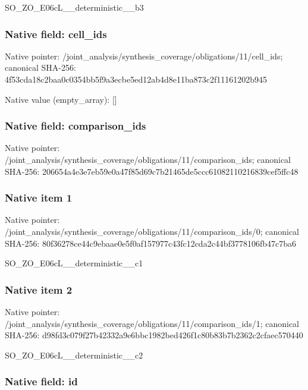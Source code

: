 \documentclass[10pt,a4paper]{article}
\begin{document}
SO\_ZO\_E06cL\_\_deterministic\_\_b3


\subsubsection{Native field: cell\_ids}


Native pointer: /joint\_analysis/synthesi\allowbreak{}s\_coverage/obligations/1\allowbreak{}1/cell\_ids; canonical SHA-256: 4f53cda18c2baa0c0354bb5f\allowbreak{}9a3ecbe5ed12ab4d8e11ba87\allowbreak{}3c2f11161202b945



Native value (empty\_array): []



\subsubsection{Native field: comparison\_ids}


Native pointer: /joint\_analysis/synthesi\allowbreak{}s\_coverage/obligations/1\allowbreak{}1/comparison\_ids; canonical SHA-256: 206654a4e3e7eb59e0a47f85\allowbreak{}d69c7b21465de5ccc6108211\allowbreak{}0216839cef5ffc48



\subsubsection{Native item 1}


Native pointer: /joint\_analysis/synthesi\allowbreak{}s\_coverage/obligations/1\allowbreak{}1/comparison\_ids/0; canonical SHA-256: 80f36278ce44c9ebaae0e5f0\allowbreak{}af157977c43fc12cda2c44bf\allowbreak{}3778106fb47c7ba6


SO\_ZO\_E06cL\_\_deterministic\_\_c1


\subsubsection{Native item 2}


Native pointer: /joint\_analysis/synthesi\allowbreak{}s\_coverage/obligations/1\allowbreak{}1/comparison\_ids/1; canonical SHA-256: d98fd3c079f27b42332a9e6b\allowbreak{}bc1982bed426f1c80b83b7b2\allowbreak{}362c2cfaec570440


SO\_ZO\_E06cL\_\_deterministic\_\_c2


\subsubsection{Native field: id}
\end{document}
